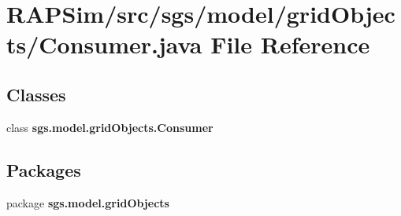 \section{R\-A\-P\-Sim/src/sgs/model/grid\-Objects/\-Consumer.java File Reference}
\label{_consumer_8java}
\subsection*{Classes}
\begin{DoxyCompactItemize}
\item 
class {\bf sgs.\-model.\-grid\-Objects.\-Consumer}
\end{DoxyCompactItemize}
\subsection*{Packages}
\begin{DoxyCompactItemize}
\item 
package {\bf sgs.\-model.\-grid\-Objects}
\end{DoxyCompactItemize}

